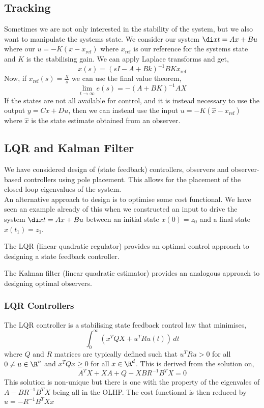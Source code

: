 \subsection{Tracking}
Sometimes we are not only interested in the stability of the system, but we also want to manipulate the systems state. We consider our system $\di x t = Ax + Bu$ where our $u = -K(x - x_{\text{ref}})$ where $x_{\text{ref}}$ is our reference for the systems state and $K$ is the stabilising gain. We can apply Laplace transforms and get,
$$ x(s) = (sI - A + Bk)^{-1}BKx_{\text{ref}} $$
Now, if $x_{\text{ref}}(s) = \frac{X}{s}$ we can use the final value theorem,
$$ \lim_{t \to \infty} e(s) = -(A + BK)^{-1}AX $$
If the states are not all available for control, and it is instead necessary to use the output $y = Cx + Du$, then we can instead use the input $u = -K(\hat x - x_{\text{ref}} )$ where $\hat x$ is the state estimate obtained from an observer.


\subsection{LQR and Kalman Filter}
We have considered design of (state feedback) controllers,
observers and observer-based controllers using pole placement.
This allows for the placement of the closed-loop eigenvalues of the system.\\

\noindent
An alternative approach to design is to optimise some cost
functional. We have seen an example already of this when we
constructed an input to drive the system $\di x t = Ax + Bu$ between an initial state $x(0) = z_0$ and a final state $x(t_1) = z_1$.\\

\begin{ndefi}[LQR]
  The LQR (linear quadratic regulator) provides an optimal control approach to designing a state feedback controller.
\end{ndefi}

\begin{ndefi}
  The Kalman filter (linear quadratic estimator) provides an analogous approach to designing optimal observers.
\end{ndefi}

\subsubsection{LQR Controllers}


The LQR controller is a stabilising state feedback control law that minimises,
$$ \int_0^\infty (x^TQX+u^TRu(t))\,dt$$
where $Q$ and $R$ matrices are typically defined such that $u^TRu>0$ for all $0 \ne u \in \R^n$ and $x^TQx \ge 0$ for all $x \in \R^d$. This is derived from the solution on,
$$ A^TX + XA + Q - XBR^{-1}B^TX = 0 $$
This solution is non-unique but there is one with the property of the eigenvales of $A - BR^{-1}B^TX$ being all in the OLHP. The cost functional is then reduced by $u = -R^{-1}B^TXx$\\

